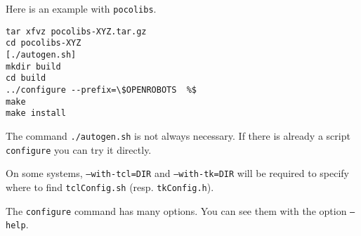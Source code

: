 Here is an
example with \texttt{pocolibs}. 

\begin{cartouche}
\begin{verbatim}
tar xfvz pocolibs-XYZ.tar.gz
cd pocolibs-XYZ
[./autogen.sh]
mkdir build
cd build
../configure --prefix=\$OPENROBOTS  %$
make
make install
\end{verbatim}
\end{cartouche}

The command \texttt{./autogen.sh} is not always necessary. If there is
already a script \texttt{configure} you can try it directly.

On some systems, \texttt{--with-tcl=DIR} and \texttt{--with-tk=DIR} will be
required to specify where to find \texttt{tclConfig.sh} (resp. \texttt{tkConfig.h}). 

The \texttt{configure} command has many options. You can see them with the
option \texttt{--help}. 


